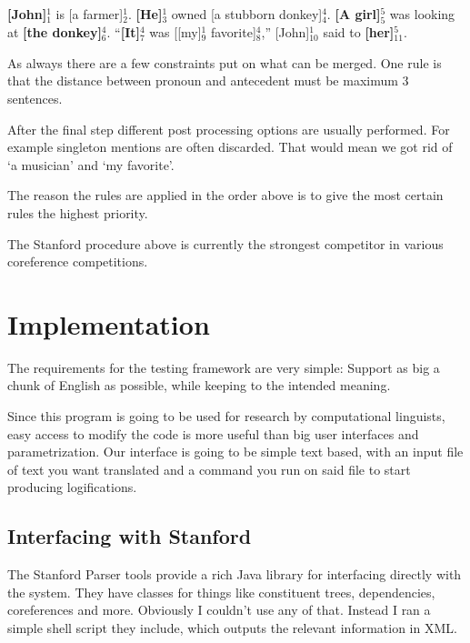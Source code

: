 \documentclass[12pt]{article}
\let\stdsection\section
\renewcommand\section{\newpage\stdsection}
\begin{document}
\begin{description}
\textbf{[John]$_1^1$} is [a farmer]$_2^1$. \textbf{[He]$_3^1$} owned [a stubborn donkey]$_4^4$.\newline
\textbf{[A girl]$_5^5$} was looking at \textbf{[the donkey]$_6^4$}.\newline
``\textbf{[It]$_7^4$} was [[my]$_9^1$ favorite]$_8^4$,'' [John]$_{10}^1$ said to \textbf{[her]$_{11}^{5}$}.

As always there are a few constraints put on what can be merged. One rule is that the distance between pronoun and antecedent must be maximum 3 sentences.
\end{description}

After the final step different post processing options are usually performed. For example singleton mentions are often discarded. That would mean we got rid of `a musician' and `my favorite'.

The reason the rules are applied in the order above is to give the most certain rules the highest priority.

The Stanford procedure above is currently the strongest competitor in various coreference competitions.\cite{lee2011stanford}\cite{raghunathan2010multi}

\section{Implementation}

The requirements for the testing framework are very simple: Support as big a chunk of English as possible, while keeping to the intended meaning.

Since this program is going to be used for research by computational linguists, easy access to modify the code is more useful than big user interfaces and parametrization. Our interface is going to be simple text based, with an input file of text you want translated and a command you run on said file to start producing logifications.

\subsection{Interfacing with Stanford}

The Stanford Parser tools provide a rich Java library for interfacing directly with the system. They have classes for things like constituent trees, dependencies, coreferences and more. Obviously I couldn't use any of that. Instead I ran a simple shell script they include, which outputs the relevant information in XML.
\end{document}
